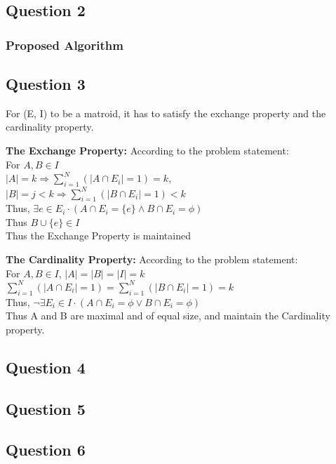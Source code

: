 \documentclass{article}
\begin{document}
\subsection*{Question 2}
\subsubsection*{Proposed Algorithm}

\subsection*{Question 3}

For (E, I) to be a matroid, it has to satisfy the exchange property and the cardinality property.

\textbf{The Exchange Property:} According to the problem statement:\\
For $A, B \in I\:$\\
$\mid A \mid = k \Rightarrow \sum_{i=1}^N \left( \mid A \cap E_i \mid = 1 \right) = k$,\\ 
$\mid B \mid = j < k \Rightarrow \sum_{i=1}^N \left( \mid B \cap E_i \mid = 1 \right) < k $\\
Thus, $\exists e \in E_i \cdot \left(  A \cap E_i = \{ e \} \wedge B \cap E_i = \phi \right)$\\
Thus $B \cup \{e \} \in I$\\
Thus the Exchange Property is maintained

\textbf{The Cardinality Property:} According to the problem statement:\\
For $A, B \in I$, $\mid A \mid = \mid B \mid = \mid I \mid = k$\\
$\sum_{i=1}^N \left( \mid A \cap E_i \mid = 1 \right) = 
\sum_{i=1}^N \left( \mid B \cap E_i \mid = 1 \right)= k$\\
Thus, $\neg\exists E_i \in I \cdot \left( A \cap E_i = \phi \vee B \cap E_i = \phi \right)$\\
Thus A and B are maximal and of equal size, and maintain the Cardinality property.

\subsection*{Question 4}


\clearpage

\subsection*{Question 5}

\subsection*{Question 6}
\end{document}
